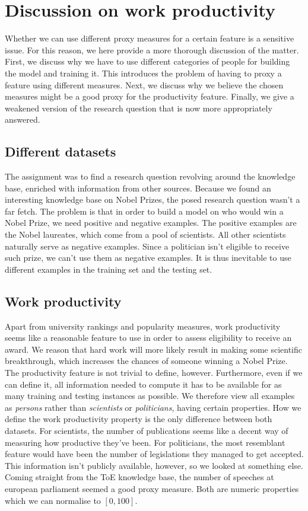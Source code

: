 \section{Discussion on work productivity}

Whether we can use different proxy measures for a certain feature is a sensitive issue. For this reason, we here provide a more thorough discussion of the matter. First, we discuss why we have to use different categories of people for building the model and training it. This introduces the problem of having to proxy a feature using  different measures. Next, we discuss why we believe the chosen measures might be a good proxy for the productivity feature. Finally, we give a weakened version of the research question that is now more appropriately answered.

\subsection{Different datasets}

The assignment was to find a research question revolving around the knowledge base, enriched with information from other sources. Because we found an interesting knowledge base on Nobel Prizes, the posed research question wasn't a far fetch. The problem is that in order to build a model on who would win a Nobel Prize, we need positive and negative examples. The positive examples are the Nobel laureates, which come from a pool of scientists. All other scientists naturally serve as negative examples. Since a politician isn't eligible to receive such prize, we can't use them as negative examples. It is thus inevitable to use different examples in the training set and the testing set.

\subsection{Work productivity}

Apart from university rankings and popularity measures, work productivity seems like a reasonable feature to use in order to assess eligibility to receive an award. We reason that hard work will more likely result in making some scientific breakthrough, which increases the chances of someone winning a Nobel Prize. The productivity feature is not trivial to define, however. Furthermore, even if we can define it, all information needed to compute it has to be available for as many training and testing instances as possible. We therefore view all examples as \emph{persons} rather than \emph{scientists} or \emph{politicians}, having certain properties. How we define the work productivity property is the only difference between both datasets. For scientists, the number of publications seems like a decent way of measuring how productive they've been. For politicians, the most resemblant feature would have been the number of legislations they managed to get accepted. This information isn't publicly available, however, so we looked at something else. Coming straight from the ToE knowledge base, the number of speeches at european parliament seemed a good proxy measure. Both are numeric properties which we can normalise to $[0, 100]$.

